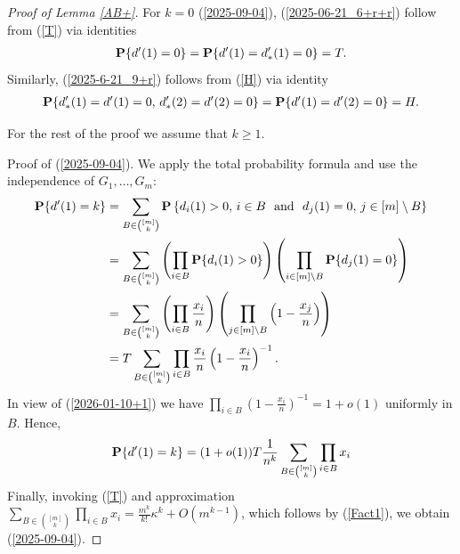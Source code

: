 \documentclass[11pt, a4paper]{article}
\newcommand{\PP}{{\bf{P}}}
\begin{document}
\begin{proof}[ Proof of Lemma \ref{AB+}]
For $k=0$ (\ref{2025-09-04}), (\ref{2025-06-21_6+r+r}) follow from (\ref{T}) via identities
\begin{align*}
\PP\{d'(1)=0\}
=
\PP\{d'(1)=d'_*(1)=0\}
= 
T.
\end{align*}
Similarly,  (\ref{2025-6-21_9+r}) follows from (\ref{H})
via identity
\begin{align*}
\PP\{d_*'(1)=d'(1)=0,\, d_*'(2)=d'(2)=0\}
=
\PP\{d'(1)=d'(2)=0\}=H.
\end{align*}

For the rest of the proof we assume that $k\ge 1$.



Proof of (\ref{2025-09-04}).
 We apply the total probability formula and use the independence of 
 $G_1,\dots, G_m$:
 \begin{align*}
 \PP\{d'(1)=k\}
&
=
\sum_{B\in\binom{[m]}{k}}
\PP
\left\{
d_i(1)>0,\, i\in B
\
\ 
{\text{and}}
\
\
d_j(1)=0, \, j \in[m]\setminus B
\right\}
\\
\nonumber
&
=
\sum_{B\in\binom{[m]}{k}}
\left(
\prod_{i\in B}
\PP\{d_i(1)>0\}
\right)
\left(
\prod_{i\in[m]\setminus B}
\PP\{d_j(1)=0\}
\right)
\\
\nonumber
&=
\sum_{B\in\binom{[m]}{k}}
\left(
\prod_{i\in B}
\frac{x_{i}}{n}
\right)
\left(
\prod_{j\in[m]\setminus B}
\left(
1
-
\frac{x_j}{n}
\right)
\right)
\\
&
=
T
\sum_{B\in\binom{[m]}{k}}
\prod_{i\in B}\frac{x_{i}}{n}
\left( 1-\frac{x_i}{n}\right)^{-1}.
\end{align*}
In view of (\ref{2026-01-10+1}) we 
have $\prod_{i\in B}
\left( 1-\frac{x_i}{n}\right)^{-1}=
1+o(1)$ uniformly 
in  $B$.
Hence,
 \begin{align*}
 \PP\{d'(1)=k\}
=
(1+o(1))
T\frac{1}{n^k}
\sum_{B\in\binom{[m]}{k}}
\prod_{i\in B}x_{i}
\end{align*}
Finally, 
invoking 
 (\ref{T}) and approximation 
$\sum_{B\in\binom{[m]}{k}}
\prod_{i\in B}x_{i}
=
\frac{m^k}{k!}\kappa^k+O(m^{k-1})$, which follows by 
(\ref{Fact1}),  we obtain 
 (\ref{2025-09-04}).


\end{proof}
\end{document}
